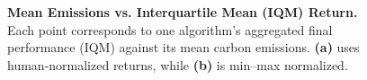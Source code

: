 \begin{figure} 
	\centering
	\quad
	\caption{\textbf{Mean Emissions vs. Interquartile Mean (IQM) Return.}
		Each point corresponds to one algorithm’s aggregated final performance (IQM) against its mean carbon emissions. 
		\textbf{(a)} uses human‐normalized returns, while \textbf{(b)} is min--max normalized.}
	\label{fig:scatter_emissions_a}
\end{figure}

